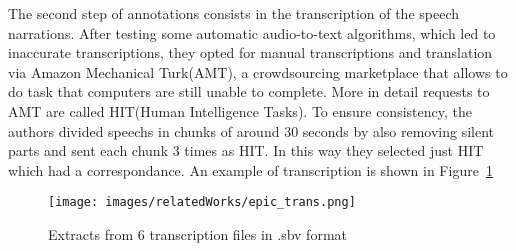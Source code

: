 The second step of annotations consists in the transcription of the speech narrations. After testing some automatic audio-to-text 
algorithms, which led to inaccurate transcriptions, they opted for manual transcriptions and translation via Amazon Mechanical Turk(AMT), a crowdsourcing
marketplace that allows to do task that computers  are still unable to complete. More in detail requests to AMT are called HIT(Human Intelligence Tasks).
To ensure consistency, the authors divided speechs in chunks of around 30 seconds by also removing silent parts and sent each chunk 3 times as HIT.
In this way they selected just HIT which had a correspondance. An example of transcription is shown in Figure~\ref{fig:epic_trans}
\begin{figure}
    \centering
    \texttt{[image: images/relatedWorks/epic\_trans.png]} %
    \caption{Extracts from 6 transcription files in .sbv format}\label{fig:epic_trans}
\end{figure}

